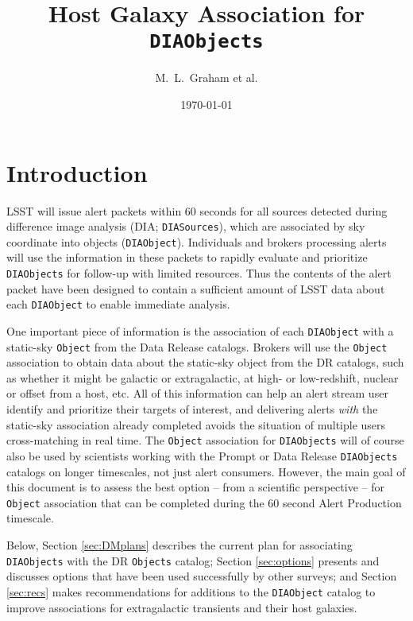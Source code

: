 \documentclass[DM,lsstdraft,authoryear,toc]{lsstdoc}
\title[Host Association]{Host Galaxy Association for {\tt DIAObjects}}
\author{%
M.~L.~Graham et al.
}
\date{\today}
\begin{document}

\maketitle

\section{Introduction} \label{sec:intro}

LSST will issue alert packets within $60$ seconds for all sources detected during difference image analysis (DIA; {\tt DIASources}), which are associated by sky coordinate into objects ({\tt DIAObject}). 
Individuals and brokers processing alerts will use the information in these packets to rapidly evaluate and prioritize {\tt DIAObjects} for follow-up with limited resources.
Thus the contents of the alert packet have been designed to contain a sufficient amount of LSST data about each {\tt DIAObject} to enable immediate analysis.

One important piece of information is the association of each {\tt DIAObject} with a static-sky {\tt Object} from the Data Release catalogs.
Brokers will use the {\tt Object} association to obtain data about the static-sky object from the DR catalogs, such as whether it might be galactic or extragalactic, at high- or low-redshift, nuclear or offset from a host, etc.
All of this information can help an alert stream user identify and prioritize their targets of interest, and delivering alerts \emph{with} the static-sky association already completed avoids the situation of multiple users cross-matching in real time.
The {\tt Object} association for {\tt DIAObjects} will of course also be used by scientists working with the Prompt or Data Release {\tt DIAObjects} catalogs on longer timescales, not just alert consumers.
However, the main goal of this document is to assess the best option -- from a scientific perspective -- for {\tt Object} association that can be completed during the 60 second Alert Production timescale.

Below, Section \ref{sec:DMplans} describes the current plan for associating {\tt DIAObjects} with the DR {\tt Objects} catalog; Section \ref{sec:options} presents and discusses options that have been used successfully by other surveys; and Section \ref{sec:recs} makes recommendations for additions to the {\tt DIAObject} catalog to improve associations for extragalactic transients and their host galaxies.
\end{document}

